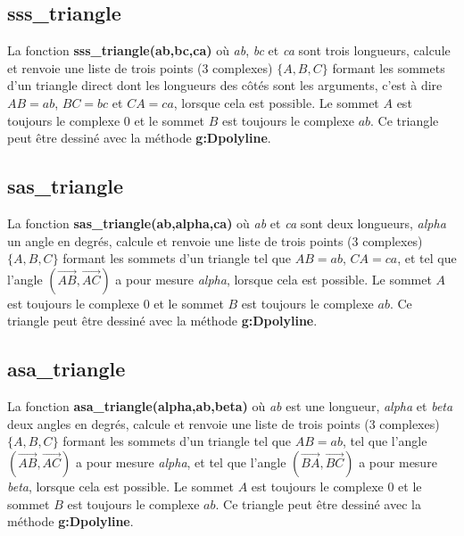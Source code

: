 \subsection{sss\_triangle}

La fonction \textbf{sss\_triangle(ab,bc,ca)} où \emph{ab}, \emph{bc} et \emph{ca} sont trois longueurs, calcule et renvoie une liste de trois points (3 complexes) $\{A,B,C\}$ formant les sommets d'un triangle direct dont les longueurs des côtés sont les arguments, c'est à dire $AB=ab$, $BC=bc$ et $CA=ca$, lorsque cela est possible. Le sommet $A$ est toujours le complexe $0$ et le sommet $B$ est toujours le complexe $ab$. Ce triangle peut être dessiné avec la méthode \textbf{g:Dpolyline}.

\subsection{sas\_triangle}

La fonction \textbf{sas\_triangle(ab,alpha,ca)} où \emph{ab} et \emph{ca} sont deux longueurs, \emph{alpha} un angle en degrés, calcule et renvoie une liste de trois points (3 complexes) $\{A,B,C\}$ formant les sommets d'un triangle tel que $AB=ab$, $CA=ca$, et tel que l'angle $(\vec{AB},\vec{AC})$ a pour mesure \emph{alpha}, lorsque cela est possible. Le sommet $A$ est toujours le complexe $0$ et le sommet $B$ est toujours le complexe $ab$. Ce triangle peut être dessiné avec la méthode \textbf{g:Dpolyline}.

\subsection{asa\_triangle}

La fonction \textbf{asa\_triangle(alpha,ab,beta)} où \emph{ab} est une longueur, \emph{alpha} et \emph{beta} deux angles en degrés, calcule et renvoie une liste de trois points (3 complexes) $\{A,B,C\}$ formant les sommets d'un triangle tel que $AB=ab$, tel que l'angle $(\vec{AB},\vec{AC})$ a pour mesure \emph{alpha}, et tel que l'angle $(\vec{BA},\vec{BC})$ a pour mesure \emph{beta}, lorsque cela est possible. Le sommet $A$ est toujours le complexe $0$ et le sommet $B$ est toujours le complexe $ab$. Ce triangle peut être dessiné avec la méthode \textbf{g:Dpolyline}.


